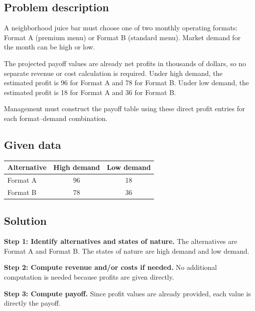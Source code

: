 

	
	\begin{ExamProblems}
		\item
		\subsection*{Problem description}
		A neighborhood juice bar must choose one of two monthly operating formats: Format A (premium menu)
		or Format B (standard menu). Market demand for the month can be high or low.
		
		The projected payoff values are already net profits in thousands of dollars, so no separate revenue or cost calculation is required.
		Under high demand, the estimated profit is 96 for Format A and 78 for Format B. Under low demand, the estimated profit is 18 for Format A and 36 for Format B.
		
		Management must construct the payoff table using these direct profit entries for each format--demand combination.
		\subsection*{Given data}
		\begin{center}
			\begin{tabular}{l c c}
				\toprule
				Alternative & High demand & Low demand \\
				\midrule
				Format A & 96 & 18 \\
				Format B & 78 & 36 \\
				\bottomrule
			\end{tabular}
		\end{center}
		
		\subsection*{Solution}
		\textbf{Step 1: Identify alternatives and states of nature.} The alternatives are Format A and Format B. The states of nature are high demand and low demand.
		
		\textbf{Step 2: Compute revenue and/or costs if needed.} No additional computation is needed because profits are given directly.
		
		\textbf{Step 3: Compute payoff.} Since profit values are already provided, each value is directly the payoff.
		

\end{ExamProblems}
